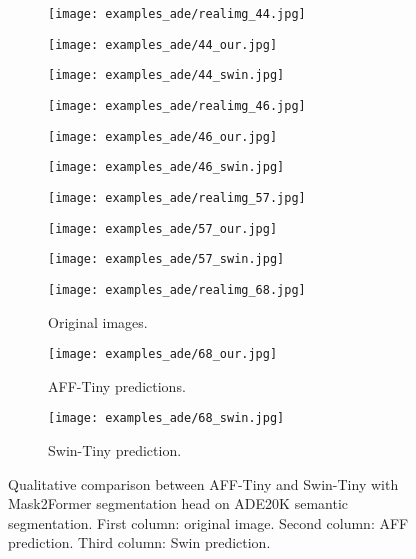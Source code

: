 \documentclass[10pt,twocolumn,letterpaper]{article}
\begin{document}
\begin{figure*}
    \centering
    \begin{subfigure}{0.32\linewidth}
        \texttt{[image: examples\_ade/realimg\_44.jpg]} 
\end{subfigure}
   \hfill
   \begin{subfigure}{0.32\linewidth}
    \texttt{[image: examples\_ade/44\_our.jpg]} 
\end{subfigure}
   \hfill
   \begin{subfigure}{0.32\linewidth}
    \texttt{[image: examples\_ade/44\_swin.jpg]} 
\end{subfigure}

   \begin{subfigure}{0.32\linewidth}
        \texttt{[image: examples\_ade/realimg\_46.jpg]} 
\end{subfigure}
   \hfill
   \begin{subfigure}{0.32\linewidth}
    \texttt{[image: examples\_ade/46\_our.jpg]} 
\end{subfigure}
   \hfill
   \begin{subfigure}{0.32\linewidth}
    \texttt{[image: examples\_ade/46\_swin.jpg]} 
\end{subfigure}

   \begin{subfigure}{0.32\linewidth}
        \texttt{[image: examples\_ade/realimg\_57.jpg]} 
\end{subfigure}
   \hfill
   \begin{subfigure}{0.32\linewidth}
    \texttt{[image: examples\_ade/57\_our.jpg]} 
\end{subfigure}
   \hfill
   \begin{subfigure}{0.32\linewidth}
    \texttt{[image: examples\_ade/57\_swin.jpg]} 
\end{subfigure}

   \begin{subfigure}{0.32\linewidth}
        \texttt{[image: examples\_ade/realimg\_68.jpg]} 
     \caption{Original images.}
   \end{subfigure}
   \hfill
   \begin{subfigure}{0.32\linewidth}
    \texttt{[image: examples\_ade/68\_our.jpg]} 
     \caption{AFF-Tiny predictions.}
   \end{subfigure}
   \hfill
   \begin{subfigure}{0.32\linewidth}
    \texttt{[image: examples\_ade/68\_swin.jpg]} 
     \caption{Swin-Tiny prediction.}
   \end{subfigure}
    \caption{Qualitative comparison between AFF-Tiny and Swin-Tiny with Mask2Former segmentation head on ADE20K semantic segmentation. First column: original image. Second column: AFF prediction. Third column: Swin prediction.}
    \label{fig:examples_ade}
\end{figure*}
\end{document}
